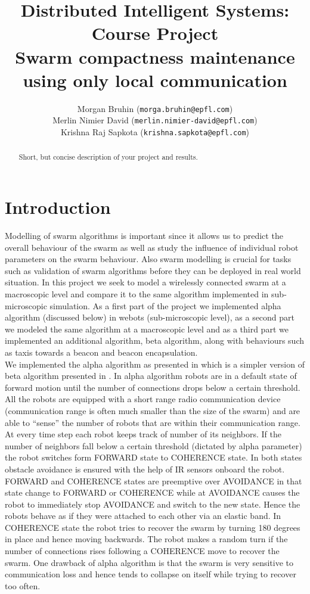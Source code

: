 \documentclass[a4paper, 10pt, conference]{ieeeconf}
\title{ %
  Distributed Intelligent Systems: Course Project\\
  Swarm compactness maintenance using only local communication
}
\author{
  Morgan Bruhin (\texttt{morga.bruhin@epfl.com}) \\
  Merlin Nimier David (\texttt{merlin.nimier-david@epfl.com}) \\
  Krishna Raj Sapkota (\texttt{krishna.sapkota@epfl.com})
}
\begin{document}
\maketitle
\thispagestyle{empty}
\pagestyle{empty}

\begin{abstract}
  Short, but concise description of your project and results.
\end{abstract}

\section{Introduction}
  Modelling of swarm algorithms is important since it allows us to predict the overall behaviour of the swarm as well as study the influence of individual robot parameters on the swarm behaviour. Also swarm modelling is crucial for tasks such as validation of swarm algorithms before they can be deployed in real world situation. In this project we seek to model a wirelessly connected swarm at a macroscopic level and compare it to the same algorithm implemented in sub-microscopic simulation. As a first part of the project we implemented alpha algorithm (discussed below) in webots (sub-microscopic level), as a second part we modeled the same algorithm at a macroscopic level and as a third part we implemented an additional algorithm, beta algorithm, along with behaviours such as taxis towards a beacon and beacon encapsulation.\\

  We implemented the alpha algorithm as presented in \cite{Winfield08} which is a simpler version of beta algorithm presented in \cite{Nembrini02}. In alpha algorithm robots are in a default state of forward motion until the number of connections drops below a certain threshold. All the robots are equipped with a short range radio communication device (communication range is often much smaller than the size of the swarm) and are able to ``sense'' the number of robots that are within their communication range. At every time step each robot keeps track of number of its neighbors. If the number of neighbors fall below a certain threshold (dictated by alpha parameter) the robot switches form FORWARD state to COHERENCE state. In both states obstacle avoidance is ensured with the help of IR sensors onboard the robot. FORWARD and COHERENCE states are preemptive over AVOIDANCE in that state change to FORWARD or COHERENCE while at AVOIDANCE causes the robot to immediately stop AVOIDANCE and switch to the new state.  Hence the robots behave as if they were attached to each other via an elastic band. In COHERENCE state the robot tries to recover the swarm by turning 180 degrees in place and hence moving backwards. The robot makes a random turn if the number of connections rises following a COHERENCE move to recover the swarm. One drawback of alpha algorithm is that the swarm is very sensitive to communication loss and hence tends to collapse on itself while trying to recover too often.
\end{document}
